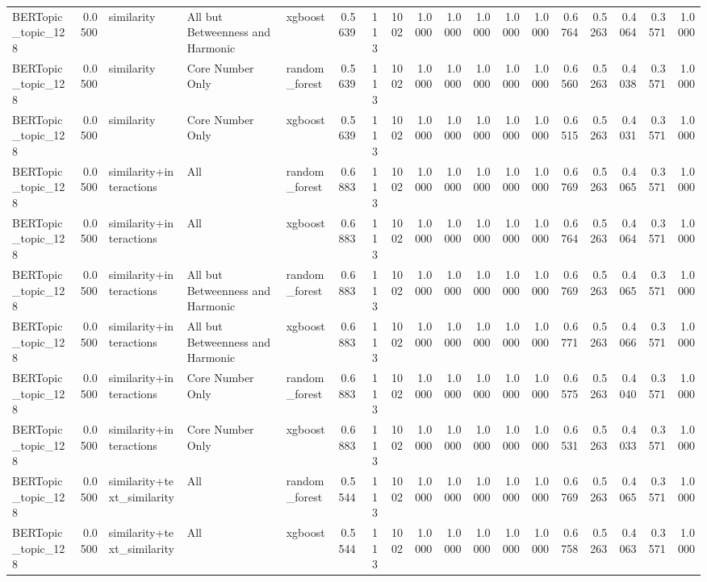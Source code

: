 \begin{tabular}{lrlllrrrrrrrrrrrrr}
BERTopic_topic_128 & 0.0500 & similarity & All but Betweenness and Harmonic & xgboost & 0.5639 & 113 & 1002 & 1.0000 & 1.0000 & 1.0000 & 1.0000 & 1.0000 & 0.6764 & 0.5263 & 0.4064 & 0.3571 & 1.0000 \\
BERTopic_topic_128 & 0.0500 & similarity & Core Number Only & random_forest & 0.5639 & 113 & 1002 & 1.0000 & 1.0000 & 1.0000 & 1.0000 & 1.0000 & 0.6560 & 0.5263 & 0.4038 & 0.3571 & 1.0000 \\
BERTopic_topic_128 & 0.0500 & similarity & Core Number Only & xgboost & 0.5639 & 113 & 1002 & 1.0000 & 1.0000 & 1.0000 & 1.0000 & 1.0000 & 0.6515 & 0.5263 & 0.4031 & 0.3571 & 1.0000 \\
BERTopic_topic_128 & 0.0500 & similarity+interactions & All & random_forest & 0.6883 & 113 & 1002 & 1.0000 & 1.0000 & 1.0000 & 1.0000 & 1.0000 & 0.6769 & 0.5263 & 0.4065 & 0.3571 & 1.0000 \\
BERTopic_topic_128 & 0.0500 & similarity+interactions & All & xgboost & 0.6883 & 113 & 1002 & 1.0000 & 1.0000 & 1.0000 & 1.0000 & 1.0000 & 0.6764 & 0.5263 & 0.4064 & 0.3571 & 1.0000 \\
BERTopic_topic_128 & 0.0500 & similarity+interactions & All but Betweenness and Harmonic & random_forest & 0.6883 & 113 & 1002 & 1.0000 & 1.0000 & 1.0000 & 1.0000 & 1.0000 & 0.6769 & 0.5263 & 0.4065 & 0.3571 & 1.0000 \\
BERTopic_topic_128 & 0.0500 & similarity+interactions & All but Betweenness and Harmonic & xgboost & 0.6883 & 113 & 1002 & 1.0000 & 1.0000 & 1.0000 & 1.0000 & 1.0000 & 0.6771 & 0.5263 & 0.4066 & 0.3571 & 1.0000 \\
BERTopic_topic_128 & 0.0500 & similarity+interactions & Core Number Only & random_forest & 0.6883 & 113 & 1002 & 1.0000 & 1.0000 & 1.0000 & 1.0000 & 1.0000 & 0.6575 & 0.5263 & 0.4040 & 0.3571 & 1.0000 \\
BERTopic_topic_128 & 0.0500 & similarity+interactions & Core Number Only & xgboost & 0.6883 & 113 & 1002 & 1.0000 & 1.0000 & 1.0000 & 1.0000 & 1.0000 & 0.6531 & 0.5263 & 0.4033 & 0.3571 & 1.0000 \\
BERTopic_topic_128 & 0.0500 & similarity+text_similarity & All & random_forest & 0.5544 & 113 & 1002 & 1.0000 & 1.0000 & 1.0000 & 1.0000 & 1.0000 & 0.6769 & 0.5263 & 0.4065 & 0.3571 & 1.0000 \\
BERTopic_topic_128 & 0.0500 & similarity+text_similarity & All & xgboost & 0.5544 & 113 & 1002 & 1.0000 & 1.0000 & 1.0000 & 1.0000 & 1.0000 & 0.6758 & 0.5263 & 0.4063 & 0.3571 & 1.0000 \\

\end{tabular}
